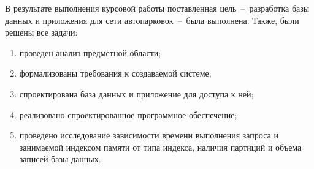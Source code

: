 В результате выполнения курсовой работы поставленная цель~--~разработка базы данных и приложения для сети автопарковок~--~была выполнена. Также, были решены все задачи:
\begin{enumerate}
	\item проведен анализ предметной области;
	\item формализованы требования к создаваемой системе;
	\item спроектирована база данных и приложение для доступа к ней;
	\item реализовано спроектированное программное обеспечение;
	\item проведено исследование зависимости времени выполнения запроса и занимаемой индексом памяти от типа индекса, наличия партиций и объема записей базы данных.
\end{enumerate}
